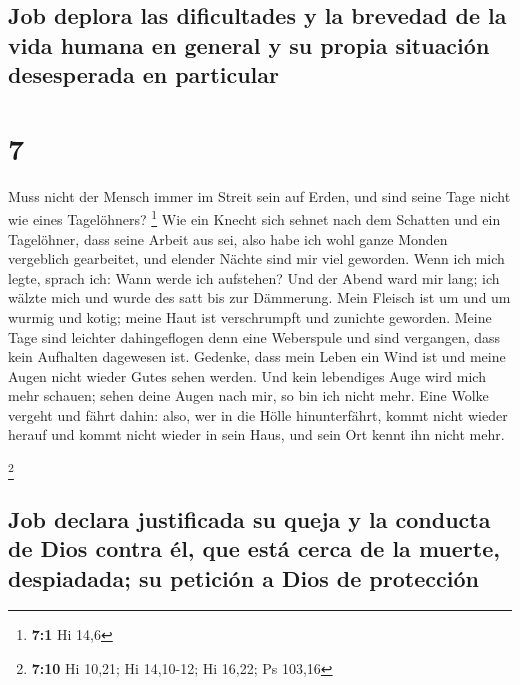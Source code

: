 \hypertarget{job-deplora-las-dificultades-y-la-brevedad-de-la-vida-humana-en-general-y-su-propia-situaciuxf3n-desesperada-en-particular}{%
\subsection{Job deplora las dificultades y la brevedad de la vida humana
en general y su propia situación desesperada en
particular}\label{job-deplora-las-dificultades-y-la-brevedad-de-la-vida-humana-en-general-y-su-propia-situaciuxf3n-desesperada-en-particular}}

\hypertarget{section-6}{%
\section{7}\label{section-6}}

 Muss nicht der Mensch immer im Streit sein auf Erden, und
sind seine Tage nicht wie eines Tagelöhners? \footnote{\textbf{7:1} Hi
  14,6}  Wie ein Knecht sich sehnet nach dem Schatten und
ein Tagelöhner, dass seine Arbeit aus sei,  also habe ich
wohl ganze Monden vergeblich gearbeitet, und elender Nächte sind mir
viel geworden.  Wenn ich mich legte, sprach ich: Wann
werde ich aufstehen? Und der Abend ward mir lang; ich wälzte mich und
wurde des satt bis zur Dämmerung.  Mein Fleisch ist um und
um wurmig und kotig; meine Haut ist verschrumpft und zunichte geworden.
 Meine Tage sind leichter dahingeflogen denn eine
Weberspule und sind vergangen, dass kein Aufhalten dagewesen ist.
 Gedenke, dass mein Leben ein Wind ist und meine Augen
nicht wieder Gutes sehen werden.  Und kein lebendiges Auge
wird mich mehr schauen; sehen deine Augen nach mir, so bin ich nicht
mehr.  Eine Wolke vergeht und fährt dahin: also, wer in
die Hölle hinunterfährt, kommt nicht wieder herauf  und
kommt nicht wieder in sein Haus, und sein Ort kennt ihn nicht mehr.

\footnote{\textbf{7:10} Hi 10,21; Hi 14,10-12; Hi 16,22; Ps 103,16}

\hypertarget{job-declara-justificada-su-queja-y-la-conducta-de-dios-contra-uxe9l-que-estuxe1-cerca-de-la-muerte-despiadada-su-peticiuxf3n-a-dios-de-protecciuxf3n}{%
\subsection{Job declara justificada su queja y la conducta de Dios
contra él, que está cerca de la muerte, despiadada; su petición a Dios
de
protección}\label{job-declara-justificada-su-queja-y-la-conducta-de-dios-contra-uxe9l-que-estuxe1-cerca-de-la-muerte-despiadada-su-peticiuxf3n-a-dios-de-protecciuxf3n}}

